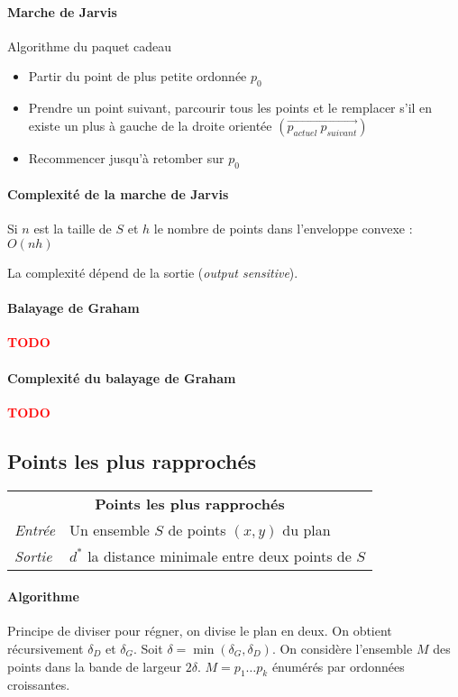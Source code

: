\documentclass[french]{article}
\newcommand{\TODO}{\textcolor{red}{\textbf{TODO}}}
\begin{document}
\paragraph{Marche de Jarvis} Algorithme du paquet cadeau
\begin{itemize}
	\item Partir du point de plus petite ordonnée $p_0$
	\item Prendre un point suivant, parcourir tous les points et le remplacer s'il en existe un plus à gauche de la droite orientée $(\vec{p_{actuel}~p_{suivant}})$
	\item Recommencer jusqu'à retomber sur $p_0$
\end{itemize}

\paragraph{Complexité de la marche de Jarvis} Si $n$ est la taille de $S$ et $h$ le nombre de points dans l'enveloppe convexe : $O(nh)$

La complexité dépend de la sortie (\emph{output sensitive}).


\paragraph{Balayage de Graham}\TODO

\paragraph{Complexité du balayage de Graham}\TODO

\subsection{Points les plus rapprochés}

\vspace{0.5cm}
\begin{tabularx}{\textwidth}{p{1cm}X}
\multicolumn{2}{c}{\textbf{Points les plus rapprochés}} \\ 
\emph{Entrée} & Un ensemble $S$ de points $(x,y)$ du plan \\ 
\emph{Sortie} & $d^*$ la distance minimale entre deux points de $S$ \\
\end{tabularx}

\paragraph{Algorithme}Principe de diviser pour régner, on divise le plan en deux. On obtient récursivement $\delta_D$ et $\delta_G$. Soit $\delta = \min (\delta_G, \delta_D)$. On considère l'ensemble $M$ des points dans la bande de largeur $2\delta$. $M = p_1 \ldots p_k$ énumérés par ordonnées croissantes.
\end{document}
